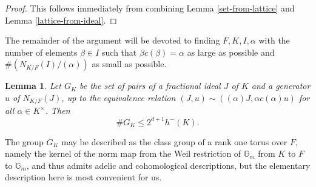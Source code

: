 \documentclass[12pt]{amsart}
\newtheorem{lemma}[theo]{Lemma}
\theoremstyle{remark}
\theoremstyle{definition}
\begin{document}
\begin{proof} This follows immediately from combining Lemma \ref{set-from-lattice} and Lemma \ref{lattice-from-ideal}.\end{proof}

The remainder of the argument will be devoted to finding $F,K, I , \alpha$ with the number of elements $\beta \in I $ such that $\beta c(\beta)=\alpha$ as large as possible and  $\# (N_{K/F}(I)/(\alpha))$ as small as possible.



\begin{lemma}\label{modified-class-group} Let $G_K$ be the set of pairs of a fractional ideal $J$ of $K$ and a generator $u$ of $N_{K/F}(J)$, up to the equivalence relation $(J, u ) \sim ( (\alpha)J, \alpha c(\alpha) u)$ for all $\alpha \in K^\times$. Then  \begin{equation}\label{eq-mcg} \#G_K \leq  2^{d+1} h^{-}(K).\end{equation} \end{lemma}

The group $G_K$ may be described as the class group of a rank one torus over $F$, namely the kernel of the norm map from the Weil restriction of $\mathbb G_m$ from $K$ to $F$ to $\mathbb G_m$, and thus admits adelic and cohomological descriptions, but the elementary description here is most convenient for us.
\end{document}
